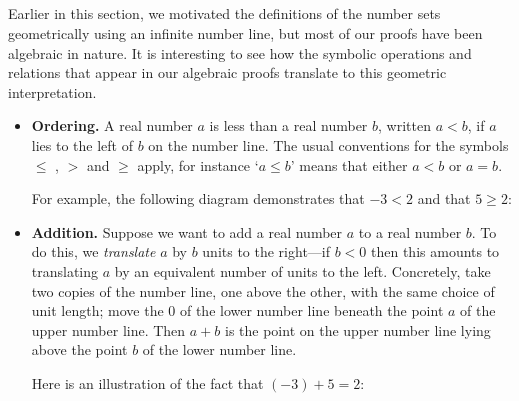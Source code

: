 \subsection*{}

Earlier in this section, we motivated the definitions of the number sets geometrically using an infinite number line, but most of our proofs have been algebraic in nature. It is interesting to see how the symbolic operations and relations that appear in our algebraic proofs translate to this geometric interpretation.

\begin{itemize}
\item \textbf{Ordering.} A real number $a$ is less than a real number $b$, written $a<b$, if $a$ lies to the left of $b$ on the number line. The usual conventions for the symbols $\le$ , $>$ and $\ge$  apply, for instance `$a \le b$' means that either $a < b$ or $a = b$.

For example, the following diagram demonstrates that $-3 < 2$ and that $5 \ge 2$:

\begin{center}
\end{center}

\item \textbf{Addition.} Suppose we want to add a real number $a$ to a real number $b$. To do this, we \textit{translate} $a$ by $b$ units to the right---if $b<0$ then this amounts to translating $a$ by an equivalent number of units to the left. Concretely, take two copies of the number line, one above the other, with the same choice of unit length; move the $0$ of the lower number line beneath the point $a$ of the upper number line. Then $a+b$ is the point on the upper number line lying above the point $b$ of the lower number line.

Here is an illustration of the fact that $(-3) + 5 = 2$:

\begin{center}
\end{center}
\end{itemize}
